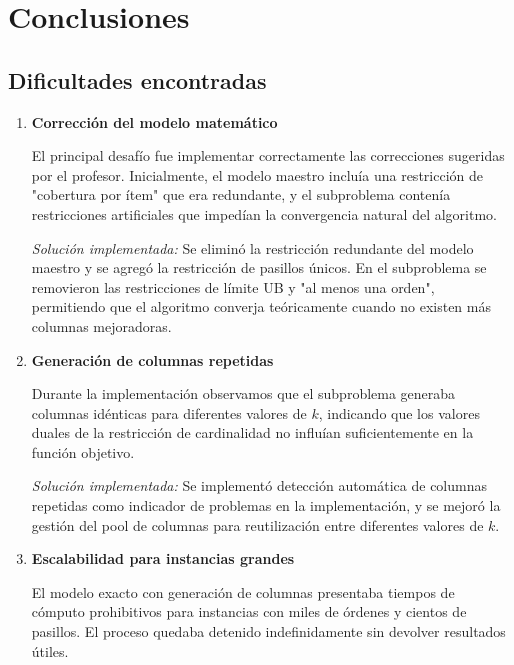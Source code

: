 \documentclass[a4paper,12pt]{article}
\begin{document}
\clearpage

\section{Conclusiones}

\subsection*{Dificultades encontradas}

\begin{enumerate}

    \item \textbf{Corrección del modelo matemático}
    
    El principal desafío fue implementar correctamente las correcciones sugeridas por el profesor. Inicialmente, el modelo maestro incluía una restricción de "cobertura por ítem" que era redundante, y el subproblema contenía restricciones artificiales que impedían la convergencia natural del algoritmo.
    
    \emph{Solución implementada:} Se eliminó la restricción redundante del modelo maestro y se agregó la restricción de pasillos únicos. En el subproblema se removieron las restricciones de límite UB y "al menos una orden", permitiendo que el algoritmo converja teóricamente cuando no existen más columnas mejoradoras.

    \item \textbf{Generación de columnas repetidas}
    
    Durante la implementación observamos que el subproblema generaba columnas idénticas para diferentes valores de $k$, indicando que los valores duales de la restricción de cardinalidad no influían suficientemente en la función objetivo.
    
    \emph{Solución implementada:} Se implementó detección automática de columnas repetidas como indicador de problemas en la implementación, y se mejoró la gestión del pool de columnas para reutilización entre diferentes valores de $k$.

    \item \textbf{Escalabilidad para instancias grandes}
    
    El modelo exacto con generación de columnas presentaba tiempos de cómputo prohibitivos para instancias con miles de órdenes y cientos de pasillos. El proceso quedaba detenido indefinidamente sin devolver resultados útiles.
    

\end{enumerate}
\end{document}
